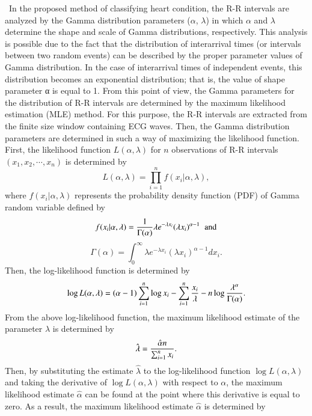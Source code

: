\documentclass[times,twocolumn,final,authoryear]{elsarticle}
\begin{document}
\
In the proposed method of classifying heart condition, the R-R intervals are analyzed by the Gamma distribution parameters ($\alpha$, $\lambda$) in which $\alpha$ and $\lambda$ determine the shape and scale of Gamma distributions, respectively. This analysis is possible due to the fact that the distribution of interarrival times (or intervals between two random events) can be described by the proper parameter values of Gamma distribution. In the case of interarrival times of independent events, this distribution becomes an exponential distribution; that is, the value of shape parameter α is equal to 1. From this point of view, the Gamma parameters for the distribution of R-R intervals are determined by the maximum likelihood estimation (MLE) method. For this purpose, the R-R intervals are extracted from the finite size window containing ECG waves. Then, the Gamma distribution parameters are determined in such a way of maximizing the likelihood function. First, the likelihood function $L(\alpha, \lambda)$ for $n$ observations of R-R intervals $(x_1, x_2, \cdots, x_n)$ is determined by
\begin{equation}
L(\alpha, \lambda) = \prod_{i=1}^n f(x_i| \alpha, \lambda),
\end{equation}        
where $f(x_i| \alpha, \lambda)$ represents the probability density function (PDF) of Gamma random variable defined by
\[
 f(x_i | \alpha, \lambda) = {1\over \Gamma (\alpha)}\lambda e^{-\lambda x_i}(\lambda x_i)^{\alpha -1} \; \; \mbox{and}\]
\[
\Gamma(\alpha) = \int_{0}^{\infty}\lambda e^{-\lambda x_i}(\lambda x_i)^{\alpha -1}dx_i.
\]
Then, the log-likelihood function is determined by
\begin{equation}
\log L(\alpha, \lambda) = (\alpha -1)\sum_{i=1}^n\log x_i - \sum_{i=1}^n{x_i\over \lambda} -
   n\log{{\lambda^{\alpha}}\over{\Gamma(\alpha)}}.
\end{equation}
From the above log-likelihood function, the maximum likelihood estimate of the parameter $\lambda$ is determined by
\begin{equation}
\hat{\lambda}={{\hat{\alpha} n}\over{\sum_{i=1}^n x_i}}. \label{lambda}
\end{equation}
Then, by substituting the estimate $\hat{\lambda}$  to the log-likelihood function $\log L(\alpha, \lambda)$ and taking the derivative of  
$\log L(\alpha, \lambda)$ with respect to $\alpha$, the maximum likelihood estimate $\hat{\alpha}$ can be found at the point where 
this derivative is equal to zero. As a result, the maximum likelihood estimate  $\hat{\alpha}$  is determined by
\end{document}
